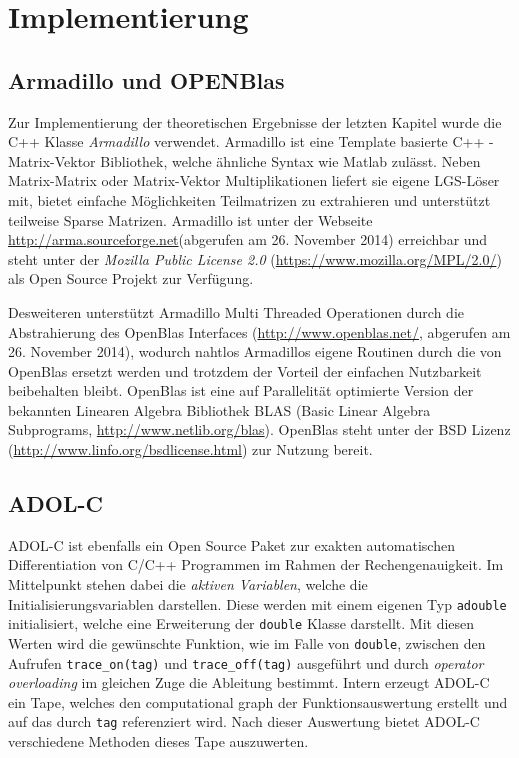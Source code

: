 \chapter{Implementierung}
\section{Armadillo und OPENBlas}
Zur Implementierung der theoretischen Ergebnisse der letzten Kapitel wurde die C++ Klasse \textit{Armadillo} verwendet. 
Armadillo ist eine Template basierte C++ -Matrix-Vektor Bibliothek, welche ähnliche Syntax wie Matlab zulässt. Neben Matrix-Matrix oder Matrix-Vektor Multiplikationen liefert sie eigene LGS-Löser mit, bietet einfache Möglichkeiten Teilmatrizen zu extrahieren und unterstützt teilweise Sparse Matrizen. Armadillo ist unter der Webseite \url{http://arma.sourceforge.net}(abgerufen am 26. November 2014) erreichbar und steht unter der \textit{Mozilla Public License 2.0} (\url{https://www.mozilla.org/MPL/2.0/}) als Open Source Projekt zur Verfügung.

Desweiteren unterstützt Armadillo Multi Threaded Operationen durch die Abstrahierung des OpenBlas Interfaces (\url{http://www.openblas.net/}, abgerufen am 26. November 2014), wodurch nahtlos Armadillos eigene Routinen durch die von OpenBlas ersetzt werden und trotzdem der Vorteil der einfachen Nutzbarkeit beibehalten bleibt. OpenBlas ist eine auf Parallelität optimierte Version der bekannten Linearen Algebra Bibliothek BLAS (Basic Linear Algebra Subprograms, \url{http://www.netlib.org/blas}). OpenBlas steht unter der BSD Lizenz (\url{http://www.linfo.org/bsdlicense.html}) zur Nutzung bereit.

\section{ADOL-C}
ADOL-C ist ebenfalls ein Open Source Paket zur exakten automatischen Differentiation von C/C++ Programmen im Rahmen der Rechengenauigkeit. Im Mittelpunkt stehen dabei die \textit{aktiven Variablen}, welche die Initialisierungsvariablen darstellen. Diese werden mit einem eigenen Typ \texttt{adouble} initialisiert, welche eine Erweiterung der \texttt{double} Klasse darstellt. Mit diesen Werten wird die gewünschte Funktion, wie im Falle von \texttt{double}, zwischen den Aufrufen \texttt{trace\_on(tag)} und \texttt{trace\_off(tag)} ausgeführt und durch \textit{operator overloading} im gleichen Zuge die Ableitung bestimmt. Intern erzeugt ADOL-C ein Tape, welches den computational graph der Funktionsauswertung erstellt und auf das durch \texttt{tag} referenziert wird. Nach dieser Auswertung bietet ADOL-C verschiedene Methoden dieses Tape auszuwerten.

